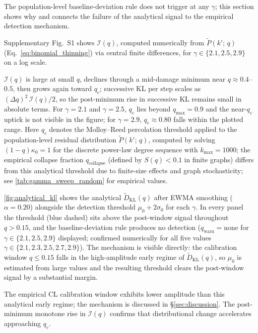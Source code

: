 \documentclass{nws}
\begin{document}
The population-level baseline-deviation rule does not trigger at any $\gamma$; this section shows why and connects the failure of the analytical signal to the empirical detection mechanism.

Supplementary Fig.~S1 shows $\mathcal{I}(q)$, computed numerically from
$\tilde{P}(k';\,q)$ (Eq.~\ref{eq:binomial_thinning}) via central finite differences,
for $\gamma\in\{2.1,2.5,2.9\}$ on a log scale.

$\mathcal{I}(q)$ is large at small $q$, declines through a mid-damage minimum near
$q\approx0.4$--$0.5$, then grows again toward $q_c$; successive KL per step scales as
$(\Delta q)^2\,\mathcal{I}(q)/2$, so the post-minimum rise in successive KL remains small
in absolute terms. For $\gamma=2.1$ and $\gamma=2.5$, $q_c$ lies beyond $q_{\max}=0.9$
and the near-$q_c$ uptick is not visible in the figure; for $\gamma=2.9$, $q_c\approx0.80$
falls within the plotted range. Here $q_c$ denotes the Molloy--Reed percolation threshold applied to the
population-level residual distribution $\tilde{P}(k';\,q)$, computed by solving
$(1-q)\kappa_0=1$ for the discrete power-law degree sequence with $k_{\max}=1000$;
the empirical collapse fraction $q_{\mathrm{collapse}}$ (defined by $S(q)<0.1$ in
finite graphs) differs from this analytical threshold due to finite-size effects and
graph stochasticity; see \autoref{tab:gamma_sweep_random} for empirical values.

\autoref{fig:analytical_kl} shows the analytical $\tilde{D}_{\mathrm{KL}}(q)$ after EWMA
smoothing ($\alpha=0.20$) alongside the detection threshold $\mu_0+2\sigma_0$ for each
$\gamma$.
In every panel the threshold (blue dashed) sits above the post-window signal throughout
$q>0.15$, and the baseline-deviation rule produces no detection ($q_{\mathrm{warn}}=\mathrm{none}$
for $\gamma\in\{2.1,2.5,2.9\}$ displayed; confirmed numerically for all five values $\gamma\in\{2.1,2.3,2.5,2.7,2.9\}$).
The mechanism is visible directly: the calibration window $q\le0.15$ falls in the
high-amplitude early regime of $\tilde{D}_{\mathrm{KL}}(q)$, so $\mu_0$ is estimated from
large values and the resulting threshold clears the post-window signal by a substantial margin.

The empirical CL calibration window exhibits lower amplitude than this analytical early
regime; the mechanism is discussed in \S\ref{sec:discussion}. The post-minimum monotone
rise in $\mathcal{I}(q)$ confirms that distributional change accelerates approaching $q_c$.
\end{document}
